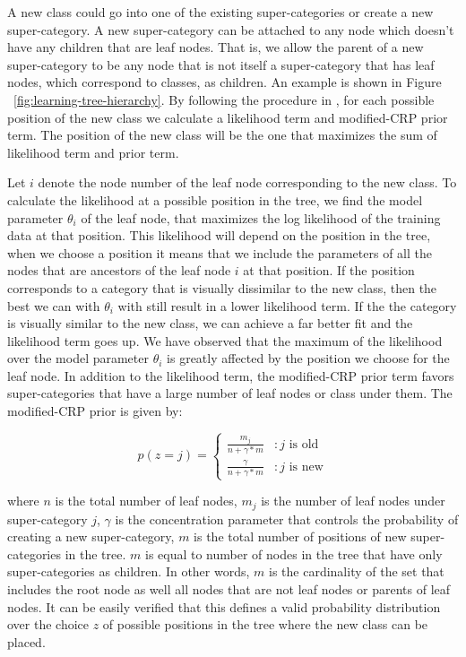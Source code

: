 \documentclass[10pt,twocolumn,letterpaper]{article}
\begin{document}
A new class could go into one of the existing super-categories or create a new super-category. A new super-category 
can be attached to any node which doesn't have any children that are leaf nodes. That is, we allow the parent of a new
super-category to be any node that is not itself a super-category that has leaf nodes, which correspond to classes, as children.
An example is shown in Figure ~\ref{fig:learning-tree-hierarchy}.
By following the procedure in \cite{ruslan}, for each possible position of the new class we calculate a likelihood term and 
modified-CRP prior term. The position of the new class will be the one that maximizes the sum of likelihood term and  prior term. 

Let $i$ denote the node number of the leaf node corresponding to the new class.   
To calculate the likelihood at a possible position in the tree, we find the model parameter $\theta_{i}$ of the leaf node, 
that maximizes the log likelihood of the training data at that position. This likelihood will depend on the position in the tree, when 
we choose a position it means that we include the parameters of all the nodes that are ancestors of the leaf node $i$ at that position. 
If the position corresponds to a category that is visually dissimilar to the new class, then the best we can with $\theta_{i}$ with still 
result in a lower likelihood term. If the the category is visually similar to the new class, we can achieve a far better fit and the likelihood
term goes up. We have observed that the maximum of the likelihood over the model parameter $\theta_{i}$ is greatly affected by the position
we choose for the leaf node. In addition to the likelihood term, the modified-CRP prior term favors super-categories that have a large number of 
 leaf nodes or class under them. The modified-CRP prior is given by:
 
 \begin{displaymath}
 p(z=j) = \left \{
	    \begin{array}{lr}
 		\frac{m_{j}}{n+\gamma*m} & : \text{$j$ is old} \\
		\frac{\gamma}{n+\gamma*m} & : \text{$j$ is new}
	   \end{array}
	  \right.
 \end{displaymath} 
 
  
where $n$ is the total number of leaf nodes, $m_{j}$
is the number of leaf nodes under super-category $j$,
$\gamma$ is the concentration parameter that controls the probability of creating a new super-category,
$m$ is the total number of positions of new super-categories in the tree. $m$ is equal to number of nodes
in the tree that have only super-categories as children. In other words, $m$ is the cardinality of the set that 
includes the root node as well all nodes that are not leaf nodes or parents of leaf nodes. It can be easily verified that 
this defines a valid probability distribution over the choice $z$ of possible positions in the tree where the new class can be placed.
\end{document}
